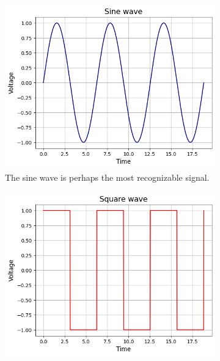 \documentclass{article}
\begin{document}
    \begin{figure}[h!]
        \centering
        \caption{There are many different types of basic digital signals. The most common types are sine, square, triangle and sawtooth.}
        \label{fig:waves}
        \begin{subfigure}[t]{0.45\textwidth}
            \includegraphics[width=\textwidth]{waves/sine.png}
            \caption{The sine wave is perhaps the most recognizable signal.}
            \label{fig:sine}
        \end{subfigure}
        \hfill
        \begin{subfigure}[t]{0.45\textwidth}
            \includegraphics[width=\textwidth]{waves/square.png}

\end{subfigure}
\end{figure}
\end{document}
